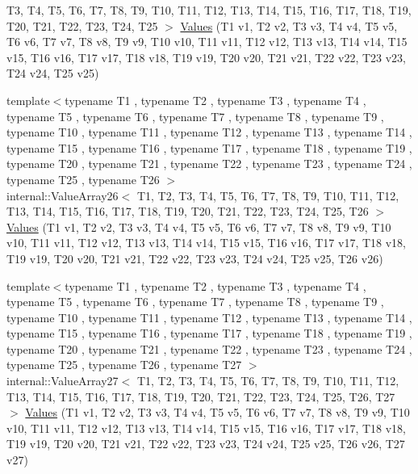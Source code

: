\begin{DoxyCompactItemize}
\-T3, \-T4, \-T5, \-T6, \-T7, \-T8, \-T9, \*
\-T10, \-T11, \-T12, \-T13, \-T14, \-T15, \*
\-T16, \-T17, \-T18, \-T19, \-T20, \-T21, \*
\-T22, \-T23, \-T24, \-T25 $>$ \hyperlink{namespacetesting_a74baf6524bda9b5799e313541b4816ea}{\-Values} (\-T1 v1, \-T2 v2, \-T3 v3, \-T4 v4, \-T5 v5, \-T6 v6, \-T7 v7, \-T8 v8, \-T9 v9, \-T10 v10, \-T11 v11, \-T12 v12, \-T13 v13, \-T14 v14, \-T15 v15, \-T16 v16, \-T17 v17, \-T18 v18, \-T19 v19, \-T20 v20, \-T21 v21, \-T22 v22, \-T23 v23, \-T24 v24, \-T25 v25)
\item 
{\footnotesize template$<$typename T1 , typename T2 , typename T3 , typename T4 , typename T5 , typename T6 , typename T7 , typename T8 , typename T9 , typename T10 , typename T11 , typename T12 , typename T13 , typename T14 , typename T15 , typename T16 , typename T17 , typename T18 , typename T19 , typename T20 , typename T21 , typename T22 , typename T23 , typename T24 , typename T25 , typename T26 $>$ }\\internal\-::\-Value\-Array26$<$ \-T1, \-T2, \*
\-T3, \-T4, \-T5, \-T6, \-T7, \-T8, \-T9, \*
\-T10, \-T11, \-T12, \-T13, \-T14, \-T15, \*
\-T16, \-T17, \-T18, \-T19, \-T20, \-T21, \*
\-T22, \-T23, \-T24, \-T25, \-T26 $>$ \hyperlink{namespacetesting_aeca27a322529e5bbd6331e40c810a123}{\-Values} (\-T1 v1, \-T2 v2, \-T3 v3, \-T4 v4, \-T5 v5, \-T6 v6, \-T7 v7, \-T8 v8, \-T9 v9, \-T10 v10, \-T11 v11, \-T12 v12, \-T13 v13, \-T14 v14, \-T15 v15, \-T16 v16, \-T17 v17, \-T18 v18, \-T19 v19, \-T20 v20, \-T21 v21, \-T22 v22, \-T23 v23, \-T24 v24, \-T25 v25, \-T26 v26)
\item 
{\footnotesize template$<$typename T1 , typename T2 , typename T3 , typename T4 , typename T5 , typename T6 , typename T7 , typename T8 , typename T9 , typename T10 , typename T11 , typename T12 , typename T13 , typename T14 , typename T15 , typename T16 , typename T17 , typename T18 , typename T19 , typename T20 , typename T21 , typename T22 , typename T23 , typename T24 , typename T25 , typename T26 , typename T27 $>$ }\\internal\-::\-Value\-Array27$<$ \-T1, \-T2, \*
\-T3, \-T4, \-T5, \-T6, \-T7, \-T8, \-T9, \*
\-T10, \-T11, \-T12, \-T13, \-T14, \-T15, \*
\-T16, \-T17, \-T18, \-T19, \-T20, \-T21, \*
\-T22, \-T23, \-T24, \-T25, \-T26, \-T27 $>$ \hyperlink{namespacetesting_a089ea706f6cdde715d03ab42aa3099d3}{\-Values} (\-T1 v1, \-T2 v2, \-T3 v3, \-T4 v4, \-T5 v5, \-T6 v6, \-T7 v7, \-T8 v8, \-T9 v9, \-T10 v10, \-T11 v11, \-T12 v12, \-T13 v13, \-T14 v14, \-T15 v15, \-T16 v16, \-T17 v17, \-T18 v18, \-T19 v19, \-T20 v20, \-T21 v21, \-T22 v22, \-T23 v23, \-T24 v24, \-T25 v25, \-T26 v26, \-T27 v27)

\end{DoxyCompactItemize}
